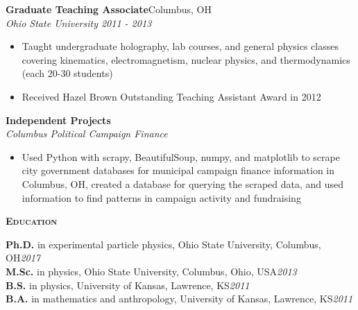 \documentclass[line]{letter}
\begin{document}
\begin{addmargin}[1em]{1em}
{\large {\bf Graduate Teaching Associate}\hfill Columbus, OH\vspace{1mm}}\\
{\large \it Ohio State University \hfill 2011 - 2013} \\
\vspace{-7mm}
\begin{itemize}[leftmargin=5mm]
\item Taught undergraduate holography, lab courses, and general physics classes covering kinematics, electromagnetism, nuclear physics, and thermodynamics (each 20-30 students)
\item Received Hazel Brown Outstanding Teaching Assistant Award in 2012
\end{itemize}

{\large {\bf Independent Projects}\vspace{1mm}}\\
{\large \it Columbus Political Campaign Finance} \\
\vspace{-7mm}
\begin{itemize}[leftmargin=5mm]
\item Used Python with scrapy, BeautifulSoup, numpy, and matplotlib to scrape city government databases for municipal campaign finance information in Columbus, OH, created a database for querying the scraped data, and used information to find patterns in campaign activity and fundraising 
\end{itemize}
\end{addmargin}


{\vspace{10pt}\Large \textsc{\textbf{Education}}}%
\begin{addmargin}[1em]{1em}
{\bf \large Ph.D.} in experimental particle physics, Ohio State University, Columbus, OH\hfill {\large \it 2017}\vspace{1mm}\\
{\bf \large M.Sc.} in physics, Ohio State University, Columbus, Ohio, USA\hfill {\large \it 2013}\vspace{1mm}\\
{\bf \large B.S.} in physics, University of Kansas, Lawrence, KS\hfill {\large \it 2011}\vspace{1mm}\\
{\bf \large B.A.} in mathematics and anthropology,  University of Kansas, Lawrence, KS\hfill {\large \it 2011}
\end{addmargin}
\end{document}
